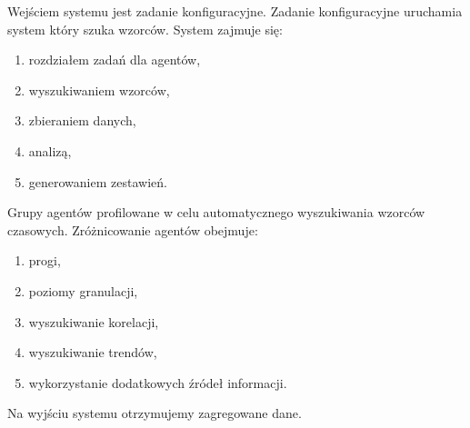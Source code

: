 \documentclass[11pt]{report}
\begin{document}
    Wejściem systemu jest zadanie konfiguracyjne.
    Zadanie konfiguracyjne uruchamia system który szuka wzorców.
    System zajmuje się:
    \begin{enumerate}
        \item rozdziałem zadań dla agentów,
        \item wyszukiwaniem wzorców,
        \item zbieraniem danych,
        \item analizą,
        \item generowaniem zestawień.
    \end{enumerate}

    Grupy agentów profilowane w celu automatycznego wyszukiwania wzorców czasowych.
    Zróżnicowanie agentów obejmuje:
    \begin{enumerate}
        \item progi,
        \item poziomy granulacji,
        \item wyszukiwanie korelacji,
        \item wyszukiwanie trendów,
        \item wykorzystanie dodatkowych źródeł informacji.
    \end{enumerate}

    Na wyjściu systemu otrzymujemy zagregowane dane.
\end{document}
